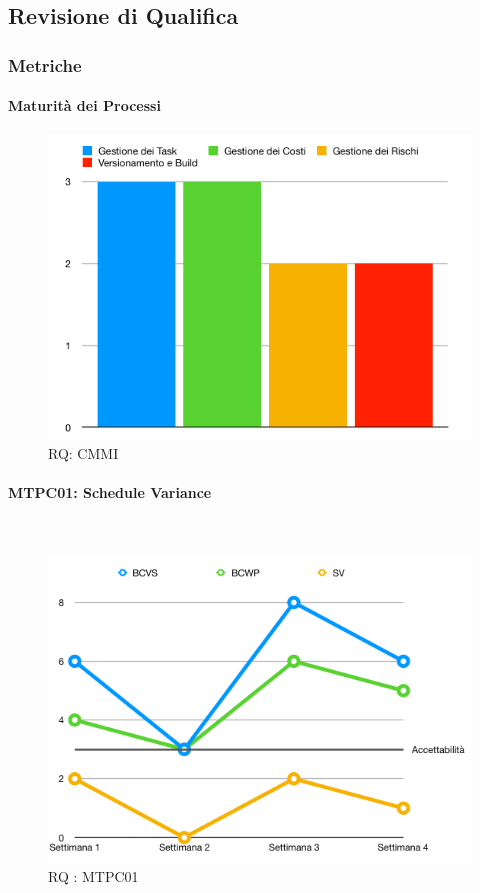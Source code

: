 \newpage
\subsection{Revisione di Qualifica}\label{metricheRQ}
\subsubsection{Metriche}
\paragraph{Maturità dei Processi}
\begin{figure}[H]
	\begin{center}
		\includegraphics[scale=0.5]{./images/grafici_RQ/maturitaProcessi.png} 
	\end{center}
	\caption{RQ: CMMI}
\end{figure}


\paragraph{MTPC01: Schedule Variance} ~\\
\begin{figure}[H]
	\begin{center}
		\includegraphics[scale=0.5]{./images/grafici_RQ/MTPC01.png} 
	\end{center}
	\caption{RQ : MTPC01}
\end{figure}

